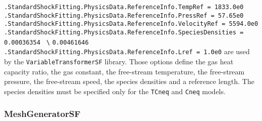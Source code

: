 \documentclass[11pt,a4paper,oneside]{article}
\begin{document}
\hspace*{1cm} \texttt{.StandardShockFitting.PhysicsData.ReferenceInfo.TempRef = 1833.0e0}
\newline
\hspace*{1cm} \texttt{.StandardShockFitting.PhysicsData.ReferenceInfo.PressRef = 57.65e0}
\newline
\hspace*{1cm} \texttt{.StandardShockFitting.PhysicsData.ReferenceInfo.VelocityRef = 5594.0e0}
\newline
\hspace*{1cm} \texttt{.StandardShockFitting.PhysicsData.ReferenceInfo.SpeciesDensities = 0.00036354}
\hspace*{14.5cm} \texttt{ \textbackslash{}}
\newline
\hspace*{14.6cm} \texttt{0.00461646}
\newline
\hspace*{1cm} \texttt{.StandardShockFitting.PhysicsData.ReferenceInfo.Lref = 1.0e0}
\newline
\newline
are used by the \texttt{VariableTransformerSF} library. 
\newline
Those options define the gas heat capacity ratio, the gas constant, the free-stream temperature, the free-stream pressure, the free-stream speed, the species densities and a reference length. The species densities must be specified only for the \texttt{TCneq} and \texttt{Cneq} models.

\subsubsection{MeshGeneratorSF}
\end{document}
